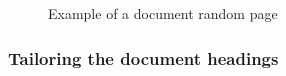 \begin{figure}
  \centering
  \caption{Example of a \multidoc document random page}
  \label{fig:multiDocHeadings}
\end{figure}



\subsubsection[Document headings]{Tailoring the document headings}
\label{subsubsec:multiDocumentHeadings}

